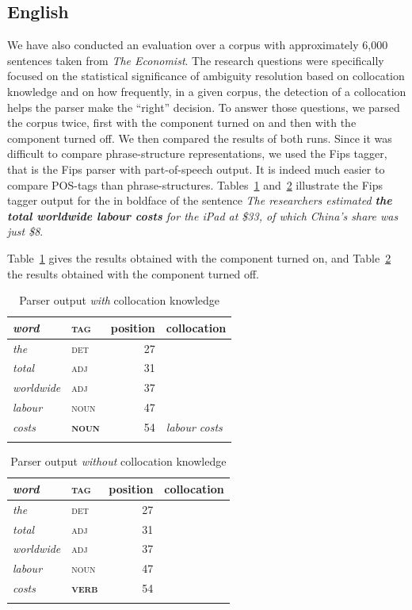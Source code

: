 \documentclass[output=paper]{langsci/langscibook}
\begin{document}
\subsection{English}
We have also conducted an evaluation over a corpus with approximately 6,000 sentences taken from \textit{The Economist}. The research questions were specifically focused on the statistical significance of ambiguity resolution based on collocation knowledge and on how frequently, in a given corpus, the detection of a collocation helps the parser make the ``right'' decision. 
To answer those questions, we parsed the corpus twice, first with the  component turned on and then with the component turned off. We then compared the results of both runs. Since it was difficult to compare phrase-structure representations, we used the Fips tagger, that is the Fips parser with part-of-speech output. It is indeed much easier to compare POS-tags than phrase-structures. Tables~\ref{fou:fig7} and~\ref{fou:fig8} illustrate the Fips tagger output for the  in boldface of the sentence \textit{The researchers estimated \textbf{the total worldwide labour costs} for the iPad at \$33, of which China’s share was just \$8}.

Table~\ref{fou:fig7} gives the results obtained with the  component turned on, and Table~\ref{fou:fig8} the results obtained with the component turned off.
 
\begin{table}
  \begin{tabular}{>{\itshape}l>{\scshape}lrl}
    \lsptoprule
    \normalfont word & \normalfont tag & position & collocation \\ %
    \midrule
    the       & det & 27\\
    total     & adj & 31 \\
    worldwide & adj & 37 \\
    labour    & noun & 47 \\
    costs & \textbf{noun} & 54 & \itshape labour costs \tabularnewline
    \lspbottomrule
  \end{tabular}
  \caption{\label{fou:fig7}Parser output \textit{with} collocation knowledge}
\end{table} 
 

\begin{table}
  \begin{tabular}{>{\itshape}l>{\scshape}lrl}
    \lsptoprule
    \normalfont word & \normalfont tag & position & collocation \\ %
    \midrule
    the       & det & 27\\
    total     & adj & 31 \\
    worldwide & adj & 37 \\
    labour    & noun & 47 \\
    costs & \textbf{verb} & 54 \tabularnewline
    \lspbottomrule
  \end{tabular}
  \caption{\label{fou:fig8}Parser output \textit{without} collocation knowledge}
\end{table} 
 
\end{document}

